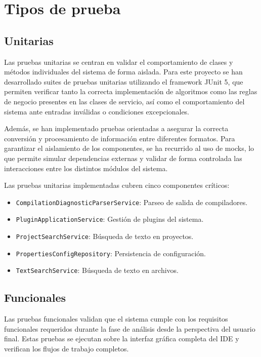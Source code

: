 \documentclass[../../main.tex]{subfiles}
\begin{document}
\section{Tipos de prueba} 

\subsection{Unitarias}
    
Las pruebas unitarias se centran en validar el comportamiento de clases y métodos individuales del sistema de forma aislada. Para este proyecto se han desarrollado suites de pruebas unitarias utilizando el framework JUnit 5, que permiten verificar tanto la correcta implementación de algoritmos como las reglas de negocio presentes en las clases de servicio, así como el comportamiento del sistema ante entradas inválidas o condiciones excepcionales.

Además, se han implementado pruebas orientadas a asegurar la correcta conversión y procesamiento de información entre diferentes formatos. Para garantizar el aislamiento de los componentes, se ha recurrido al uso de mocks, lo que permite simular dependencias externas y validar de forma controlada las interacciones entre los distintos módulos del sistema.
    
Las pruebas unitarias implementadas cubren cinco componentes críticos:
    \begin{itemize}
    \item \lstinline|CompilationDiagnosticParserService|: Parseo de salida de compiladores.
    \item \lstinline|PluginApplicationService|: Gestión de plugins del sistema.
    \item \lstinline|ProjectSearchService|: Búsqueda de texto en proyectos.
    \item \lstinline|PropertiesConfigRepository|: Persistencia de configuración.
    \item \lstinline|TextSearchService|: Búsqueda de texto en archivos.
\end{itemize}
          
\subsection{Funcionales}
    
Las pruebas funcionales validan que el sistema cumple con los requisitos funcionales requeridos durante la fase de análisis desde la perspectiva del usuario final. Estas pruebas se ejecutan sobre la interfaz gráfica completa del IDE y verifican los flujos de trabajo completos.
    
\end{document}
